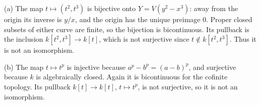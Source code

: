 (a) The map $t\mapsto(t^2,t^3)$ is bijective onto $Y=V(y^2-x^3)$: away from the origin its inverse is $y/x$, and the origin has the unique preimage $0$. Proper closed subsets of either curve are finite, so the bijection is bicontinuous. Its pullback is the inclusion $k[t^2,t^3]\to k[t]$, which is not surjective since $t\notin k[t^2,t^3]$. Thus it is not an isomorphism.

(b) The map $t\mapsto t^p$ is injective because $a^p-b^p=(a-b)^p$, and surjective because $k$ is algebraically closed. Again it is bicontinuous for the cofinite topology. Its pullback $k[t]\to k[t]$, $t\mapsto t^p$, is not surjective, so it is not an isomorphism.
